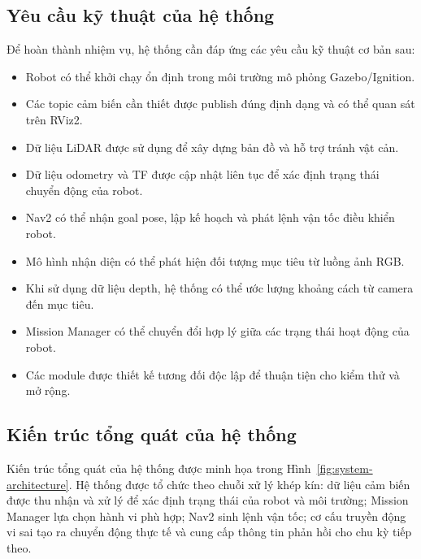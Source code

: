 \subsection{Yêu cầu kỹ thuật của hệ thống}

Để hoàn thành nhiệm vụ, hệ thống cần đáp ứng các yêu cầu kỹ thuật cơ bản sau:

\begin{itemize}
    \item Robot có thể khởi chạy ổn định trong môi trường mô phỏng Gazebo/Ignition.
    
    \item Các topic cảm biến cần thiết được publish đúng định dạng và có thể quan sát trên RViz2.
    
    \item Dữ liệu LiDAR được sử dụng để xây dựng bản đồ và hỗ trợ tránh vật cản.
    
    \item Dữ liệu odometry và TF được cập nhật liên tục để xác định trạng thái chuyển động của robot.
    
    \item Nav2 có thể nhận goal pose, lập kế hoạch và phát lệnh vận tốc điều khiển robot.
    
    \item Mô hình nhận diện có thể phát hiện đối tượng mục tiêu từ luồng ảnh RGB.
    
    \item Khi sử dụng dữ liệu depth, hệ thống có thể ước lượng khoảng cách từ camera đến mục tiêu.
    
    \item Mission Manager có thể chuyển đổi hợp lý giữa các trạng thái hoạt động của robot.
    
    \item Các module được thiết kế tương đối độc lập để thuận tiện cho kiểm thử và mở rộng.
\end{itemize}

\subsection{Kiến trúc tổng quát của hệ thống}

Kiến trúc tổng quát của hệ thống được minh họa trong 
Hình~\ref{fig:system-architecture}. Hệ thống được tổ chức theo chuỗi xử lý 
khép kín: dữ liệu cảm biến được thu nhận và xử lý để xác định trạng thái 
của robot và môi trường; Mission Manager lựa chọn hành vi phù hợp; Nav2 
sinh lệnh vận tốc; cơ cấu truyền động vi sai tạo ra chuyển động thực tế 
và cung cấp thông tin phản hồi cho chu kỳ tiếp theo.

